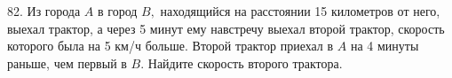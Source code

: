 82. Из города $A$ в город $B,$ находящийся на расстоянии 15 километров от него, выехал трактор,
а через 5 минут ему навстречу выехал второй трактор, скорость которого была на 5 км/ч больше. Второй трактор приехал в $A$
на 4 минуты раньше, чем первый в $B.$ Найдите скорость второго трактора.\\
